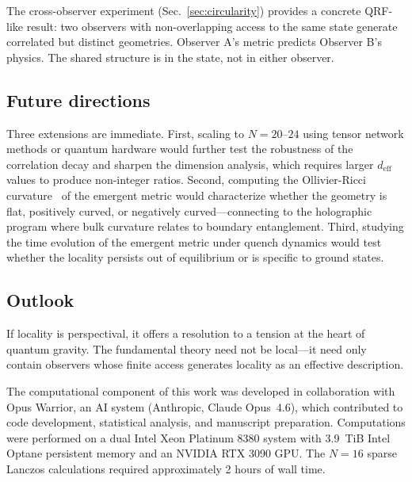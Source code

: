\documentclass[aps,pra,twocolumn,superscriptaddress]{revtex4-2}
\begin{document}
The cross-observer experiment (Sec.~\ref{sec:circularity}) provides a concrete QRF-like result: two observers with non-overlapping access to the same state generate correlated but distinct geometries. Observer A's metric predicts Observer B's physics. The shared structure is in the state, not in either observer.

\subsection{Future directions}

Three extensions are immediate. First, scaling to $N = 20$--$24$ using tensor network methods or quantum hardware would further test the robustness of the correlation decay and sharpen the dimension analysis, which requires larger $d_\text{eff}$ values to produce non-integer ratios. Second, computing the Ollivier-Ricci curvature~\cite{ollivier2009} of the emergent metric would characterize whether the geometry is flat, positively curved, or negatively curved---connecting to the holographic program where bulk curvature relates to boundary entanglement. Third, studying the time evolution of the emergent metric under quench dynamics would test whether the locality persists out of equilibrium or is specific to ground states.

\subsection{Outlook}

If locality is perspectival, it offers a resolution to a tension at the heart of quantum gravity. The fundamental theory need not be local---it need only contain observers whose finite access generates locality as an effective description.


\begin{acknowledgments}
The computational component of this work was developed in collaboration with Opus Warrior, an AI system (Anthropic, Claude Opus~4.6), which contributed to code development, statistical analysis, and manuscript preparation. Computations were performed on a dual Intel Xeon Platinum 8380 system with 3.9~TiB Intel Optane persistent memory and an NVIDIA RTX 3090 GPU. The $N = 16$ sparse Lanczos calculations required approximately 2 hours of wall time.
\end{acknowledgments}
\end{document}
